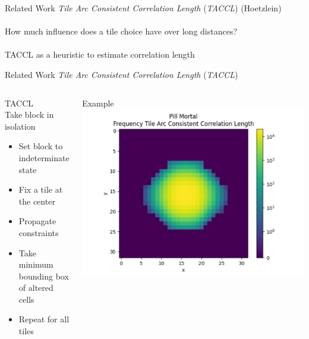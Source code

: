 \documentclass{beamer}
\begin{document}

  \begin{frame}[fragile]{Related Work}
    \textit{Tile Arc Consistent Correlation Length} (\textit{TACCL}) (Hoetzlein) \\
    \hfill \\
    How much influence does a tile choice have over long distances? \\
    \hfill \\
    TACCL as a heuristic to estimate correlation length
  \end{frame}


  \begin{frame}[fragile]{Related Work}
    \textit{Tile Arc Consistent Correlation Length} (\textit{TACCL})
    \begin{columns}[T,onlytextwidth]
        \begin{block}{TACCL}
          \hfill \\
          Take block in isolation
          \begin{itemize}
            \item Set block to indeterminate state
            \item Fix a tile at the center
            \item Propagate constraints
            \item Take minimum bounding box of altered cells
            \item Repeat for all tiles
          \end{itemize}
        \end{block}
        \begin{block}{Example}
          \includegraphics[width=1.125\textwidth]{img/pm_freq_taccl.pdf}
        \end{block}
    \end{columns}
  \end{frame}
\end{document}

